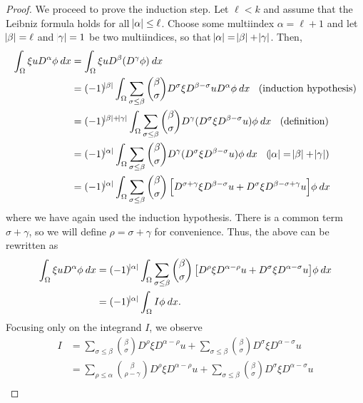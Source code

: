 \documentclass[10pt]{article}
\begin{document}
\begin{proof}
	We proceed to prove the induction step. Let $\ell < k$ and assume that the Leibniz formula holds for all $\abs{\alpha} \leq \ell$. Choose some multiindex $\alpha = \ell + 1$ and let $\abs{\beta} = \ell$ and $\abs{\gamma} = 1$ be two multiindices, so that $\abs{\alpha} = \abs{\beta} + \abs{\gamma}$. Then, 
	\begin{align*}
		\displaystyle \int_{\Omega}{\xi u D^\alpha \phi \: dx} &= \int_{\Omega}{\xi u D^\beta(D^\gamma \phi) \: dx} \\
		&= (-1)^{\abs{\beta}}\int_{\Omega}{\sum\limits_{\sigma \leq \beta}{\binom{\beta}{\sigma}}D^\sigma \xi D^{\beta - \sigma}u D^\alpha \phi \: dx} \:\:\:\: \textrm{(induction hypothesis)} \\
		&= (-1)^{\abs{\beta}+\abs{\gamma}}\int_{\Omega}{\sum\limits_{\sigma \leq \beta}{\binom{\beta}{\sigma}D^\gamma(D^\sigma \xi D^{\beta - \sigma}u)} \phi \: dx} \:\:\:\: \textrm{(definition)} \\
		&= (-1)^{\abs{\alpha}}\int_{\Omega}{\sum\limits_{\sigma \leq \beta}{\binom{\beta}{\sigma}D^\gamma(D^\sigma \xi D^{\beta - \sigma}u)} \phi \: dx} \:\:\:\: \textrm{($\abs{\alpha} = \abs{\beta} + \abs{\gamma}$)} \\
		&= (-1)^{\abs{\alpha}}\int_{\Omega}{\sum\limits_{\sigma \leq \beta}{\binom{\beta}{\sigma}\left[ D^{\sigma + \gamma}\xi D^{\beta - \sigma}u + D^\sigma \xi D^{\beta - \sigma + \gamma}u \right]}\phi \: dx}
	\end{align*}
	where we have again used the induction hypothesis. There is a common term $\sigma + \gamma$, so we will define $\rho = \sigma + \gamma$ for convenience. Thus, the above can be rewritten as 
	\begin{align*}
		\displaystyle \int_{\Omega}{\xi u D^\alpha \phi \: dx} &= (-1)^{\abs{\alpha}}\int_{\Omega}{\sum\limits_{\sigma \leq \beta}{\binom{\beta}{\sigma}\left[ D^{\rho}\xi D^{\alpha - \rho}u + D^\sigma \xi D^{\alpha - \sigma}u \right]}\phi \: dx} \\
		&= (-1)^{\abs{\alpha}}\int_{\Omega}{I \phi \: dx}.
	\end{align*}
	Focusing only on the integrand $I$, we observe
	\begin{align*}
		\displaystyle I &= \sum\limits_{\sigma \leq \beta}{\binom{\beta}{\sigma}D^{\rho}\xi D^{\alpha - \rho}u} + \sum\limits_{\sigma \leq \beta}{\binom{\beta}{\sigma}D^\sigma \xi D^{\alpha - \sigma}u} \\
		&= \sum\limits_{\rho \leq \alpha}{\binom{\beta}{\rho - \gamma}D^{\rho}\xi D^{\alpha - \rho}u} + \sum\limits_{\sigma \leq \beta}{\binom{\beta}{\sigma}D^\sigma \xi D^{\alpha - \sigma}u} \\

\end{align*}
\end{proof}
\end{document}
